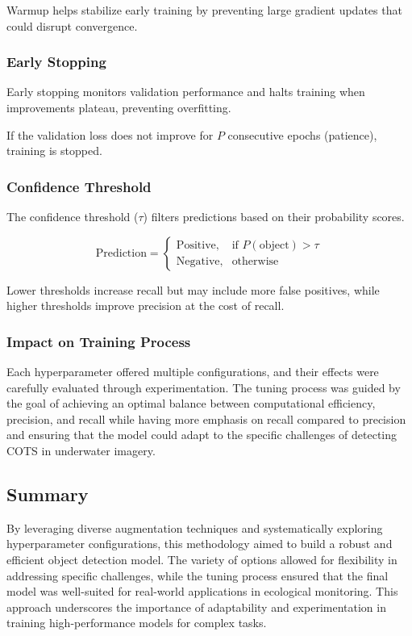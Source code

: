 \documentclass[conference]{IEEEtran}
\begin{document}
Warmup helps stabilize early training by preventing large gradient updates that could disrupt convergence.

\subsubsection{Early Stopping}

Early stopping monitors validation performance and halts training when improvements plateau, preventing overfitting.

If the validation loss does not improve for \( P \) consecutive epochs (patience), training is stopped.

\subsubsection{Confidence Threshold}

The confidence threshold (\( \tau \)) filters predictions based on their probability scores.

\[
\text{Prediction} = 
\begin{cases}
\text{Positive}, & \text{if } P(\text{object}) > \tau \\
\text{Negative}, & \text{otherwise}
\end{cases}
\]

Lower thresholds increase recall but may include more false positives, while higher thresholds improve precision at the cost of recall.

\subsubsection{Impact on Training Process}

Each hyperparameter offered multiple configurations, and their effects were carefully evaluated through experimentation. The tuning process was guided by the goal of achieving an optimal balance between computational efficiency, precision, and recall while having more emphasis on recall compared to precision and ensuring that the model could adapt to the specific challenges of detecting COTS in underwater imagery.

\subsection{Summary}

By leveraging diverse augmentation techniques and systematically exploring hyperparameter configurations, this methodology aimed to build a robust and efficient object detection model. The variety of options allowed for flexibility in addressing specific challenges, while the tuning process ensured that the final model was well-suited for real-world applications in ecological monitoring. This approach underscores the importance of adaptability and experimentation in training high-performance models for complex tasks.
\end{document}
